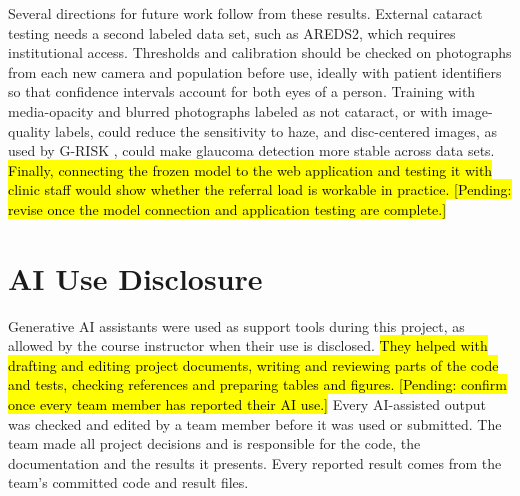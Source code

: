\documentclass[conference,a4paper]{IEEEtran}
\newcommand{\pendingedit}[1]{\hl{#1}}
\begin{document}
Several directions for future work follow from these results. External cataract testing needs a
second labeled data set, such as AREDS2, which requires institutional access. Thresholds and
calibration should be checked on photographs from each new camera and population before use, ideally
with patient identifiers so that confidence intervals account for both eyes of a person. Training
with media-opacity and blurred photographs labeled as not cataract, or with image-quality labels,
could reduce the sensitivity to haze, and disc-centered images, as used by G-RISK \cite{ref9}, could
make glaucoma detection more stable across data sets. \pendingedit{Finally, connecting the frozen model to the
web application and testing it with clinic staff would show whether the referral load is workable in
practice. [Pending: revise once the model connection and application testing are complete.]}

\section*{AI Use Disclosure}

Generative AI assistants were used as support tools during this project, as allowed by the course
instructor when their use is disclosed. \pendingedit{They helped with drafting and editing project documents,
writing and reviewing parts of the code and tests, checking references and preparing tables and
figures. [Pending: confirm once every team member has reported their AI use.]} Every AI-assisted
output was checked and edited by a team member before it was used or submitted. The team made all
project decisions and is responsible for the code, the documentation and the results it presents.
Every reported result comes from the team's committed code and result files.
\end{document}
